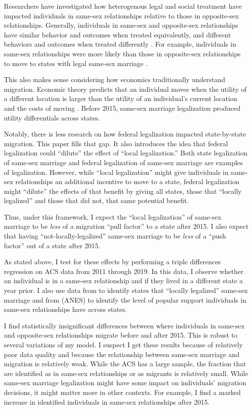 \documentclass[12pt,letterpaper]{article}
\begin{document}
Researchers have investigated how heterogenous legal and social treatment have impacted individuals in same-sex relationships relative to those in opposite-sex relationships. Generally, individuals in same-sex and opposite-sex relationships have similar behavior and outcomes when treated equivalently, and different behaviors and outcomes when treated differently \citep{2}. For example, individuals in same-sex relationships were more likely than those in opposite-sex relationships to move to states with legal same-sex marriage \citep{1, 12}.

This also makes sense considering how economics traditionally understand migration. Economic theory predicts that an individual moves when the utility of a different location is larger than the utility of an individual’s current location and the costs of moving \citep{8, 12}. Before 2015, same-sex marriage legalization produced utility differentials across states.

Notably, there is less research on how federal legalization impacted state-by-state migration. This paper fills that gap. It also introduces the idea that federal legalization could “dilute” the effect of “local legalization.” Both state legalization of same-sex marriage and federal legalization of same-sex marriage are examples of legalization. However, while “local legalization” might give individuals in same-sex relationships an additional incentive to move to a state, federal legalization might “dilute” the effects of that benefit by giving all states, those that “locally legalized” and those that did not, that same potential benefit. 

Thus, under this framework, I expect the “local legalization” of same-sex marriage to be \textit{less} of a migration “pull factor” to a state after 2015. I also expect that having “not-locally-legalized” same-sex marriage to be \textit{less} of a “push factor” out of a state after 2015.

As stated above, I test for these effects by performing a triple differences regression on ACS data from 2011 through 2019. In this data, I observe whether an individual is in a same-sex relationship and if they lived in a different state a year prior. I also use data from \citet{1} to identify states that “locally legalized” same-sex marriage and from (ANES)  to identify the level of popular support individuals in same-sex relationships have across states.

I find statistically insignificant differences between where individuals in same-sex and opposite-sex relationships migrate before and after 2015. This is robust to several variations of my model. I suspect I get these results because of relatively poor data quality and because the relationship between same-sex marriage and migration is relatively weak. While the ACS has a large sample, the fraction that are identified as in same-sex relationships or as migrants is relatively small. While same-sex marriage legalization might have some impact on individuals’ migration decisions, it might matter more in other contexts. For example, I find a marked increase in identified individuals in same-sex relationships after 2015. 
\end{document}
